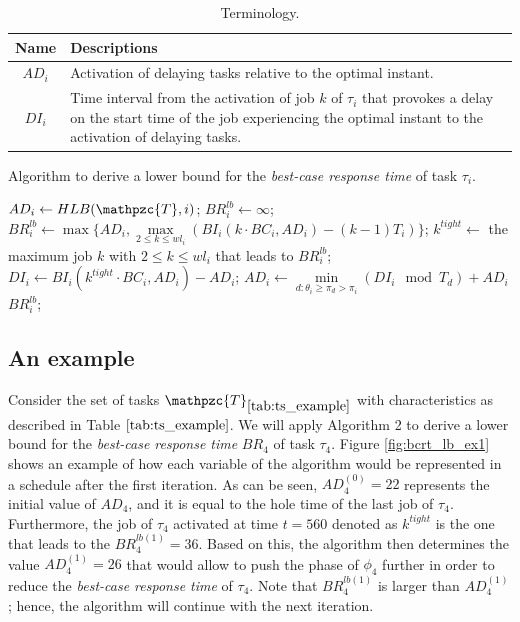 \documentclass[fleqn]{article}
\begin{document}
\begin{table}[H]
	\center
	\caption{Terminology.}
	\label{tab:terminology}
	\begin{tabular}{|c | p{9cm}|}
		\hline
		Name & Descriptions \\ 
		\hline 
		\hline
		$AD_i$& Activation of delaying tasks relative to the optimal instant.\\
		\hline
		$DI_i$& Time interval from the activation of job $k$ of $\tau_i$ that provokes a delay on the start time of the job experiencing the optimal instant to the activation of delaying tasks.\\
		\hline 
	\end{tabular}
\end{table} 

\begin{algorithm}[H]
	\caption{Algorithm to derive a lower bound for the \textit{best-case response time} of task $\tau_i$.}\label{euclid}
	\begin{algorithmic}[1]
		\State $AD_i \gets HLB(\mathpzc{T},i)$;
		\State $BR^{lb}_i \gets \infty$;
		\State $BR^{lb}_i \gets \max\{ AD_i, \max \limits_{2 \leq k \leq wl_i} (BI_i(k \cdot BC_i, AD_i) - (k-1)T_i) \}$;
		\State $k^{tight} \gets$ the maximum job $k$ with $2 \leq k \leq wl_i$ that leads to $BR^{lb}_i$;
		\State $DI_i \gets BI_i(k^{tight} \cdot BC_i, AD_i) - AD_i$;
		\State $AD_i \gets \min \limits_{d:\theta_i \geq \pi_d > \pi_i} (DI_i \mod T_d) + AD_i$
		\State \Return $BR^{lb}_i$; 
		\EndProcedure
	\end{algorithmic}
\end{algorithm}

\subsection{An example}
Consider the set of tasks $\mathpzc{T}_{\ref{tab:ts_example}}$ with characteristics as described in Table $\ref{tab:ts_example}$. We will apply Algorithm 2 to derive a lower bound for the \textit{best-case response time} $BR_4$ of task $\tau_4$. Figure \ref{fig:bcrt_lb_ex1} shows an example of how each variable of the algorithm would be represented in a schedule after the first iteration. As can be seen, $AD^{(0)}_4=22$ represents the initial value of $AD_4$, and it is equal to the hole time of the last job of $\tau_4$. Furthermore, the job of $\tau_4$ activated at time $t=560$ denoted as $k^{tight}$ is the one that leads to the $BR^{lb (1)}_4=36$. Based on this, the algorithm then determines the value $AD^{(1)}_4=26$ that would allow to push the phase of $\phi_4$ further in order to reduce the \textit{best-case response time} of $\tau_4$. Note that $BR^{lb (1)}_4$ is larger than $AD^{(1)}_4$; hence, the algorithm will continue with the next iteration.
\end{document}
